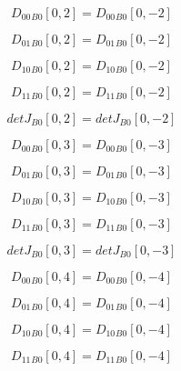 \documentclass{article}
\begin{document}
\begin{dmath}{D_{00}{_{B0}}}[{0,2}] = {D_{00}{_{B0}}}[{0,-2}]\end{dmath}

\begin{dmath}{D_{01}{_{B0}}}[{0,2}] = {D_{01}{_{B0}}}[{0,-2}]\end{dmath}

\begin{dmath}{D_{10}{_{B0}}}[{0,2}] = {D_{10}{_{B0}}}[{0,-2}]\end{dmath}

\begin{dmath}{D_{11}{_{B0}}}[{0,2}] = {D_{11}{_{B0}}}[{0,-2}]\end{dmath}

\begin{dmath}{detJ{_{B0}}}[{0,2}] = {detJ{_{B0}}}[{0,-2}]\end{dmath}

\begin{dmath}{D_{00}{_{B0}}}[{0,3}] = {D_{00}{_{B0}}}[{0,-3}]\end{dmath}

\begin{dmath}{D_{01}{_{B0}}}[{0,3}] = {D_{01}{_{B0}}}[{0,-3}]\end{dmath}

\begin{dmath}{D_{10}{_{B0}}}[{0,3}] = {D_{10}{_{B0}}}[{0,-3}]\end{dmath}

\begin{dmath}{D_{11}{_{B0}}}[{0,3}] = {D_{11}{_{B0}}}[{0,-3}]\end{dmath}

\begin{dmath}{detJ{_{B0}}}[{0,3}] = {detJ{_{B0}}}[{0,-3}]\end{dmath}

\begin{dmath}{D_{00}{_{B0}}}[{0,4}] = {D_{00}{_{B0}}}[{0,-4}]\end{dmath}

\begin{dmath}{D_{01}{_{B0}}}[{0,4}] = {D_{01}{_{B0}}}[{0,-4}]\end{dmath}

\begin{dmath}{D_{10}{_{B0}}}[{0,4}] = {D_{10}{_{B0}}}[{0,-4}]\end{dmath}

\begin{dmath}{D_{11}{_{B0}}}[{0,4}] = {D_{11}{_{B0}}}[{0,-4}]\end{dmath}
\end{document}
